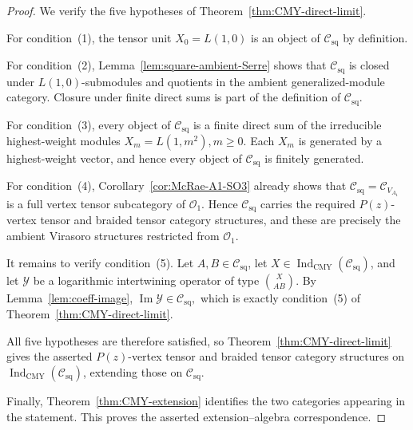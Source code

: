 \documentclass[10pt,a4paper]{amsart}
\numberwithin{equation}{section} \newtheorem{thm}{Theorem}[section] \newtheorem{lem}[thm]{Lemma} \newtheorem{ex}[thm]{Example} \newtheorem{prop}[thm]{Proposition} \newtheorem{cor}[thm]{Corollary} \newtheorem{defi}[thm]{Definition} \newtheorem{rmk}[thm]{Remark} \newtheorem{notation}[thm]{Notation}
\newcommand{\Csq}{\mathcal C_{\mathrm{sq}}}
\newcommand{\Ovir}{\mathcal O_1}
\newcommand{\IndCMY}{\operatorname{Ind}_{\mathrm{CMY}}}
\begin{document}
\begin{proof}
We verify the five hypotheses of Theorem~\ref{thm:CMY-direct-limit}.

For condition~(1), the tensor unit \(X_0=L(1,0)\) is an object of $\Csq$ by definition.

For condition~(2), Lemma~\ref{lem:square-ambient-Serre} shows that $\Csq$ is closed under $L(1,0)$-submodules and quotients in the ambient generalized-module category. Closure under finite direct sums is part of the definition of $\Csq$.

For condition~(3), every object of $\Csq$ is a finite direct sum of the irreducible highest-weight modules \(X_m=L(1,m^2),m\ge0.\) Each $X_m$ is generated by a highest-weight vector, and hence every object of $\Csq$ is finitely generated.

For condition~(4), Corollary~\ref{cor:McRae-A1-SO3} already shows that $\Csq=\mathcal C_{V_{A_1}}$ is a full vertex tensor subcategory of $\Ovir$. Hence $\Csq$ carries the required $P(z)$-vertex tensor and braided tensor category structures, and these are precisely the ambient Virasoro structures restricted from $\Ovir$.

It remains to verify condition~(5). Let $A,B\in\Csq$, let $X\in\IndCMY(\Csq)$, and let $\mathcal Y$ be a logarithmic intertwining operator of type \(\binom{X}{A B}.\) By Lemma~\ref{lem:coeff-image}, \(\operatorname{Im}\mathcal Y\in\Csq,\) which is exactly condition~(5) of Theorem~\ref{thm:CMY-direct-limit}.

All five hypotheses are therefore satisfied, so Theorem~\ref{thm:CMY-direct-limit} gives the asserted $P(z)$-vertex tensor and braided tensor category structures on $\IndCMY(\Csq)$, extending those on $\Csq$.

Finally, Theorem~\ref{thm:CMY-extension} identifies the two categories appearing in the statement. This proves the asserted extension--algebra correspondence.
\end{proof}
\end{document}
